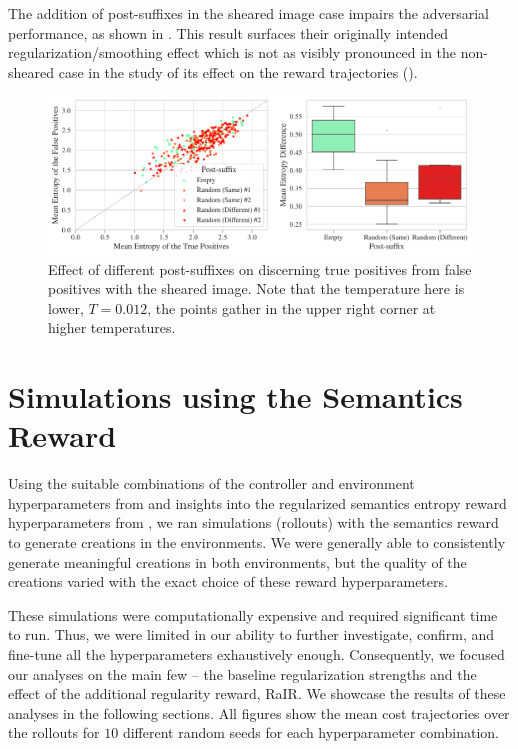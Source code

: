 The addition of post-suffixes in the sheared image case impairs the adversarial performance, as shown in .
This result surfaces their originally intended regularization/smoothing effect which is not as visibly pronounced in the non-sheared case in the study of its effect on the reward trajectories ().

\begin{figure}[H]
    \centering
    \includegraphics[width=\textwidth]{images/post-suffix_sheared_adversarial_12.pdf}
    \caption[Effect of different post-suffixes on discerning true positives from false positives with sheared images.]{Effect of different post-suffixes on discerning true positives from false positives with the sheared image. Note that the temperature here is lower, \(T = 0.012\), the points gather in the upper right corner at higher temperatures.}
    \label{fig:post-suffix_sheared_adversarial}
\end{figure}

\section{Simulations using the Semantics Reward}
\label{sec:simulations}

Using the suitable combinations of the controller and environment hyperparameters from  and insights into the regularized semantics entropy reward hyperparameters from , we ran simulations (rollouts) with the semantics reward to generate creations in the environments.
We were generally able to consistently generate meaningful creations in both environments, but the quality of the creations varied with the exact choice of these reward hyperparameters.

These simulations were computationally expensive and required significant time to run.
Thus, we were limited in our ability to further investigate, confirm, and fine-tune all the hyperparameters exhaustively enough. 
Consequently, we focused our analyses on the main few -- the baseline regularization strengths and the effect of the additional regularity reward, RaIR.
We showcase the results of these analyses in the following sections.
All figures show the mean cost trajectories over the rollouts for \(10\) different random seeds for each hyperparameter combination.

